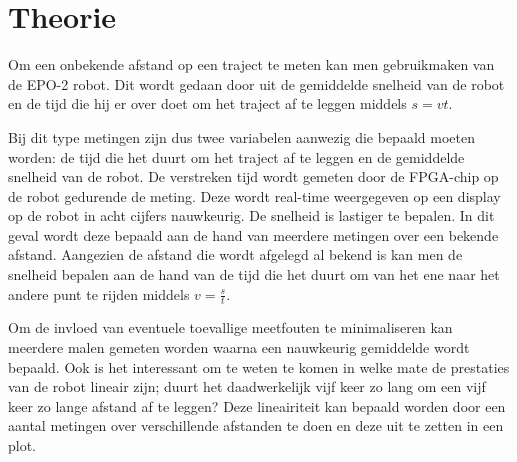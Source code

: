 \chapter{Theorie}

Om een onbekende afstand op een traject te meten kan men gebruikmaken van de EPO-2 robot. Dit wordt gedaan door uit de gemiddelde snelheid van de robot en de tijd die hij er over doet om het traject af te leggen middels $s = vt$.

Bij dit type metingen zijn dus twee variabelen aanwezig die bepaald moeten worden: de tijd die het duurt om het traject af te leggen en de gemiddelde snelheid van de robot. 
De verstreken tijd wordt gemeten door de FPGA-chip op de robot gedurende de meting. Deze wordt real-time weergegeven op een display op de robot in acht cijfers nauwkeurig.
De snelheid is lastiger te bepalen. In dit geval wordt deze bepaald aan de hand van meerdere metingen over een bekende afstand. Aangezien de afstand die wordt afgelegd al bekend is kan men de snelheid bepalen aan de hand van de tijd die het duurt om van het ene naar het andere punt te rijden middels $v=\frac{s}{t}$. 

Om de invloed van eventuele toevallige meetfouten te minimaliseren kan meerdere malen gemeten worden waarna een nauwkeurig gemiddelde wordt bepaald. Ook is het interessant om te weten te komen in welke mate de prestaties van de robot lineair zijn; duurt het daadwerkelijk vijf keer zo lang om een vijf keer zo lange afstand af te leggen? Deze lineairiteit kan bepaald worden door een aantal metingen over verschillende afstanden te doen en deze uit te zetten in een plot.
